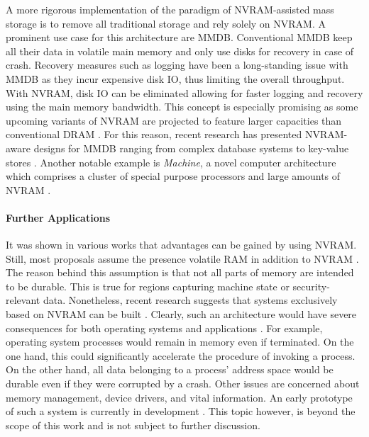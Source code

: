 A more rigorous implementation of the paradigm of NVRAM-assisted mass storage is
to remove all traditional storage and rely solely on NVRAM. A prominent use case
for this architecture are MMDB. Conventional MMDB keep all their data in
volatile main memory and only use disks for recovery in case of crash. Recovery
measures such as logging have been a long-standing issue with MMDB as they incur
expensive disk IO, thus limiting the overall throughput. With NVRAM, disk IO can
be eliminated allowing for faster logging and recovery using the main memory
bandwidth. This concept is especially promising as some upcoming variants of
NVRAM are projected to feature larger capacities than conventional DRAM
. For this reason, recent research has presented NVRAM-aware
designs for MMDB ranging from complex database systems \cite{oukid2015instant,
schwalb2016hyrise} to key-value stores \cite{bailey2013exploring, zhou2016nvht,
wu2016nvmcached}. Another notable example is \emph{Machine}, a novel computer
architecture which comprises a cluster of special purpose processors and large
amounts of NVRAM \cite{courtland2016can}.

\paragraph{Further Applications}

It was shown in various works that advantages can be gained by using NVRAM.
Still, most proposals assume the presence volatile RAM in addition to NVRAM
\cite{oukid2017data}. The reason behind this assumption is that not all parts of
memory are intended to be durable. This is true for regions capturing machine
state or security-relevant data. Nonetheless, recent research suggests that
systems exclusively based on NVRAM can be built \cite{narayanan2012whole}.
Clearly, such an architecture would have severe consequences for both operating
systems and applications \cite{bailey2011operating}. For example, operating
system processes would remain in memory even if terminated. On the one hand,
this could significantly accelerate the procedure of invoking a process. On the
other hand, all data belonging to a process' address space would be durable even
if they were corrupted by a crash. Other issues are concerned about memory
management, device drivers, and vital information. An early prototype of such a
system is currently in development \cite{courtland2016can}. This topic however,
is beyond the scope of this work and is not subject to further discussion.

